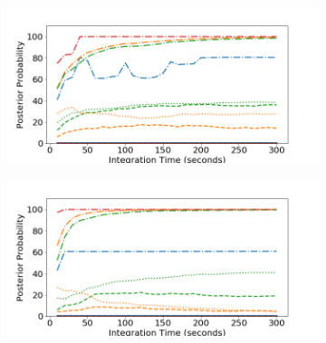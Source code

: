 \begin{figure}[H]
     \centering
     \begin{subfigure}[b]{0.49\textwidth}
         \centering
         \includegraphics[width=\textwidth]{images/realspectra-cal-cs137-0-easy.png}
         \caption{}
         \label{fig:realspectra-cal-cs137-0-easy}
     \end{subfigure}
     \hfill
     \begin{subfigure}[b]{0.49\textwidth}
         \centering
         \includegraphics[width=\textwidth]{images/realspectra-cal-cs137-1-easy.png}
         \caption{}
         \label{fig:realspectra-cal-cs137-1-easy}
     \end{subfigure}


\end{figure}
